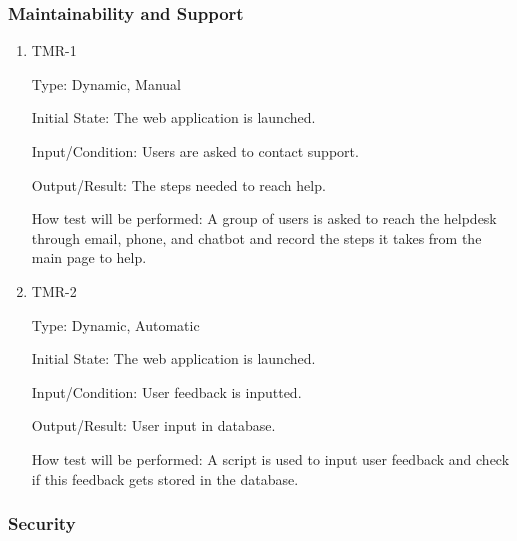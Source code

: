 \documentclass[12pt, titlepage]{article}
\begin{document}
\subsubsection{Maintainability and Support}

\begin{enumerate}
\item{TMR-1\\}

Type: Dynamic, Manual
					
Initial State: The web application is launched.
					
Input/Condition: Users are asked to contact support.
					
Output/Result: The steps needed to reach help.
					
How test will be performed: A group of users is asked to reach the helpdesk through email, phone, and chatbot and record the steps it takes from the main page to help.


\item{TMR-2\\}

Type: Dynamic, Automatic
					
Initial State: The web application is launched.
					
Input/Condition: User feedback is inputted.
					
Output/Result: User input in database.
					
How test will be performed: A script is used to input user feedback and check if this feedback gets stored in the database.

\end{enumerate}

\subsubsection{Security}
\end{document}
